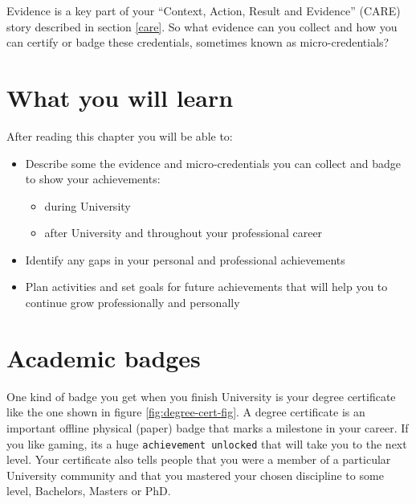 \documentclass[
]{book}
\providecommand{\tightlist}{%
  \setlength{\itemsep}{0pt}\setlength{\parskip}{0pt}}
\begin{document}
Evidence is a key part of your ``Context, Action, Result and Evidence'' (CARE) story described in section \ref{care}. So what evidence can you collect and how you can certify or badge these credentials, sometimes known as micro-credentials? 📛 \citep{microc}

\hypertarget{ilob}{%
\section{What you will learn}\label{ilob}}

After reading this chapter you will be able to:

\begin{itemize}
\tightlist
\item
  Describe some the evidence and micro-credentials you can collect and badge to show your achievements:

  \begin{itemize}
  \tightlist
  \item
    during University
  \item
    after University and throughout your professional career
  \end{itemize}
\item
  Identify any gaps in your personal and professional achievements
\item
  Plan activities and set goals for future achievements that will help you to continue grow professionally and personally
\end{itemize}

\hypertarget{academentia}{%
\section{Academic badges}\label{academentia}}

One kind of badge you get when you finish University is your degree certificate like the one shown in figure \ref{fig:degree-cert-fig}. A degree certificate is an important offline physical (paper) badge that marks a milestone in your career. If you like gaming, its a huge \texttt{achievement\ unlocked} that will take you to the next level. Your certificate also tells people that you were a member of a particular University community and that you mastered your chosen discipline to some level, Bachelors, Masters or PhD.
\end{document}
